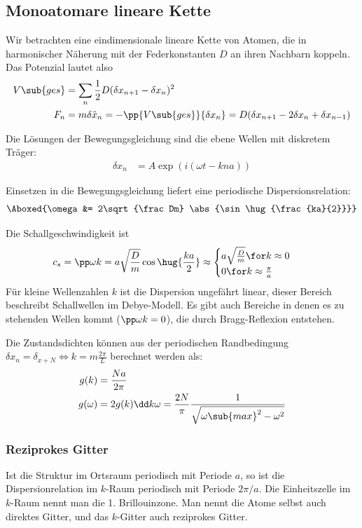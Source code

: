 \documentclass[bfvec]{summery_5.0}
\begin{document}
\subsection{Monoatomare lineare Kette}
Wir betrachten eine eindimensionale lineare Kette von Atomen, die in harmonischer Näherung mit der Federkonstanten $D$ an ihren Nachbarn koppeln.
Das Potenzial lautet also 
\begin{align*}
    V\sub{ges} &= \sum_n \frac12 D(\delta x_{n+1}-\delta x_n)^2\\
    F_n &= m\delta \ddot x_n = -\pp {V\sub{ges}}{\delta x_n} = D(\delta x_{n+1} -2\delta x_n + \delta x_{n-1})
\end{align*}

Die Lösungen der Bewegungsgleichung sind die ebene Wellen mit diskretem Träger:
\begin{align*}
    \delta x_n &= A\exp(i(\omega t- kna))
\end{align*}

Einsetzen in die Bewegungsgleichung liefert eine periodische Dispersionsrelation:
\begin{align*}
    \Aboxed{\omega &= 2\sqrt{\frac Dm} \abs{\sin\hug{\frac{ka}{2}}}}
\end{align*}

Die Schallgeschwindigkeit ist
\begin{align*}
    c_s &= \pp\omega k 
    = a\sqrt{\frac Dm} \cos\hug{\frac{ka}{2}}
    \approx \begin{cases}
        a \sqrt{\frac Dm}\for k\approx  0\\
        0 \for k \approx \frac {\pi} a
    \end{cases}
\end{align*}
Für kleine Wellenzahlen $k$ ist die Dispersion ungefährt linear, dieser Bereich beschreibt Schallwellen im Debye-Modell. Es gibt auch Bereiche in denen es zu stehenden Wellen kommt ($\pp\omega k =0$), die durch Bragg-Reflexion entstehen.

Die Zustandsdichten können aus der periodischen Randbedingung $\delta x_n = \delta_{x+N} \Leftrightarrow k = m \frac{2\pi}{L}$ berechnet werden als:
\begin{align*}
    g(k) &= \frac{Na }{2\pi} \\
    g(\omega) &= 2 g(k) \dd k \omega = \frac{2N}{\pi}\frac1{\sqrt{\omega\sub{max}^2 - \omega^2}}
\end{align*}

\subsubsection{Reziprokes Gitter}
Ist die Struktur im Ortsraum periodisch mit Periode $a$, so ist die Dispersionrelation im $k$-Raum periodisch mit Periode $2\pi/a$. Die Einheitszelle im $k$-Raum nennt man die 1. Brillouinzone. Man nennt die Atome selbst auch direktes Gitter, und das $k$-Gitter auch reziprokes Gitter.
\end{document}
